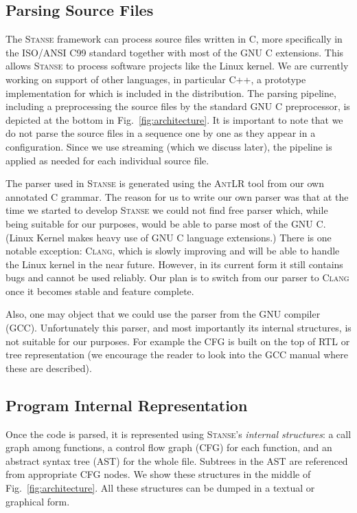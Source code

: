 \documentclass{llncs}
\newcommand{\Stanse}{\textsc{Stanse}\xspace}
\begin{document}
\subsection{Parsing Source Files}

The \Stanse framework can process source files written in C, more
specifically in the ISO/ANSI C99 standard together with most of the GNU C
extensions. This allows \Stanse to process software projects like the Linux
kernel. We are currently working on support of other languages, in
particular C++, a prototype implementation for which is included in the
distribution. The parsing pipeline, including a preprocessing the source
files by the standard GNU C preprocessor, is depicted at the bottom in
Fig.~\ref{fig:architecture}.  It is important to note that we do not parse
the source files in a sequence one by one as they appear in a
configuration. Since we use streaming (which we discuss later), the pipeline
is applied as needed for each individual source file.

The parser used in \Stanse is generated using the \textsc{AntLR} tool from
our own annotated C grammar. The reason for us to write our own parser was
that at the time we started to develop \textsc{Stanse} we could not find
free parser which, while being suitable for our purposes, would be able to
parse most of the GNU C. (Linux Kernel makes heavy use of GNU C language
extensions.)  There is one notable exception: \textsc{Clang}, which is
slowly improving and will be able to handle the Linux kernel in the near
future. However, in its current form it still contains bugs and cannot be
used reliably. Our plan is to switch from our parser to \textsc{Clang} once
it becomes stable and feature complete.

Also, one may object that we could use the parser from the GNU compiler
(GCC).  Unfortunately this parser, and most importantly its internal
structures, is not suitable for our purposes.  For example the CFG is built
on the top of RTL or tree representation (we encourage the reader to look
into the GCC manual where these are described).

\subsection{Program Internal Representation}

Once the code is parsed, it is represented using \Stanse's \emph{internal structures}: a call graph
among functions, a control flow graph (CFG) for each function, and an abstract
syntax tree (AST) for the whole file. Subtrees in the AST are referenced from
appropriate CFG nodes. We show these structures in the middle of
Fig.~\ref{fig:architecture}. All these structures can be dumped in a textual
or graphical form.
\end{document}
